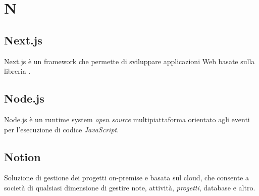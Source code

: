 \chapter{N}

\section{Next.js}
Next.js è un framework che permette di sviluppare applicazioni Web basate sulla libreria .

\section{Node.js}
Node.js è un runtime system \emph{open source} multipiattaforma orientato agli eventi per l'esecuzione di codice \emph{JavaScript}.

\section{Notion}
Soluzione di gestione dei progetti on-premise e basata sul cloud, che consente a società di qualsiasi dimensione di gestire note, attività, \emph{progetti}, database e altro.


